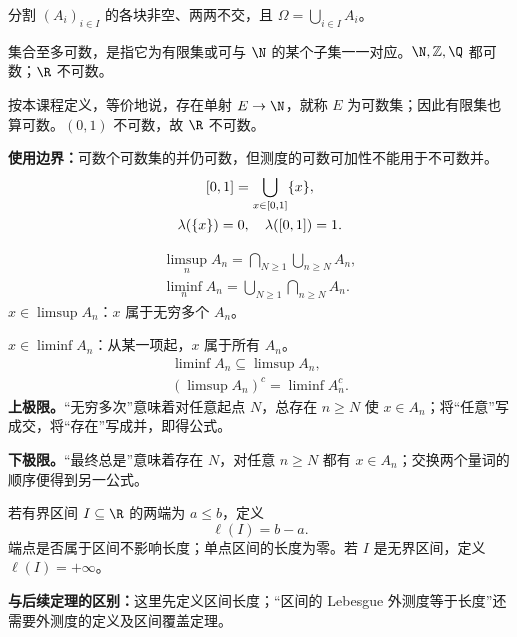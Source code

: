 分割 $(A_i)_{i\in I}$ 的各块非空、两两不交，且 $\Omega=\bigcup_{i\in I}A_i$。

集合至多可数，是指它为有限集或可与 $\N$ 的某个子集一一对应。$\N,\mathbb Z,\Q$ 都可数；$\R$ 不可数。

按本课程定义，等价地说，存在单射 $E\to\N$，就称 $E$ 为可数集；因此有限集也算可数。$(0,1)$ 不可数，故 $\R$ 不可数。

\textbf{使用边界：}可数个可数集的并仍可数，但测度的可数可加性不能用于不可数并。
\[
\begin{gathered}
\relax[0,1]=\bigcup_{x\in[0,1]}\{x\},\\
\lambda(\{x\})=0,\quad\lambda([0,1])=1.
\end{gathered}
\]

\[
\begin{gathered}
\limsup_n A_n=\bigcap_{N\ge1}\bigcup_{n\ge N}A_n,\\
\liminf_n A_n=\bigcup_{N\ge1}\bigcap_{n\ge N}A_n.
\end{gathered}
\]
$x\in\limsup A_n$：$x$ 属于无穷多个 $A_n$。

$x\in\liminf A_n$：从某一项起，$x$ 属于所有 $A_n$。
\[
\begin{gathered}
\liminf A_n\subseteq\limsup A_n,\\
(\limsup A_n)^c=\liminf A_n^c.
\end{gathered}
\]
\textbf{上极限。}“无穷多次”意味着对任意起点 $N$，总存在 $n\ge N$ 使 $x\in A_n$；将“任意”写成交，将“存在”写成并，即得公式。

\textbf{下极限。}“最终总是”意味着存在 $N$，对任意 $n\ge N$ 都有 $x\in A_n$；交换两个量词的顺序便得到另一公式。

若有界区间 $I\subseteq\R$ 的两端为 $a\le b$，定义
\[
\ell(I)=b-a.
\]
端点是否属于区间不影响长度；单点区间的长度为零。若 $I$ 是无界区间，定义 $\ell(I)=+\infty$。

\textbf{与后续定理的区别：}这里先定义区间长度；“区间的 Lebesgue 外测度等于长度”还需要外测度的定义及区间覆盖定理。

